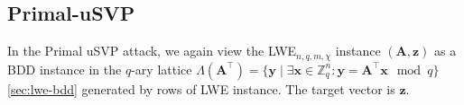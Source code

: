 \subsection[Primal-uSVP]{Primal-uSVP \cite{ADPS16, BG14}} %








In the Primal uSVP attack, we again view the LWE$_{n, q, m, \chi}$ instance $(\mathbf{A}, \mathbf{z})$ as a BDD instance in the  $q$-ary lattice $\Lambda(\mathbf{A}^\intercal) = \{ \mathbf{y} \mid \exists \mathbf{x} \in \mathbb{Z}_q^n : \mathbf{y} = \mathbf{A}^\intercal \mathbf{x}  \mod q \}$ \cref{sec:lwe-bdd} generated by rows of LWE instance. The target vector is $\mathbf{z}$. %

